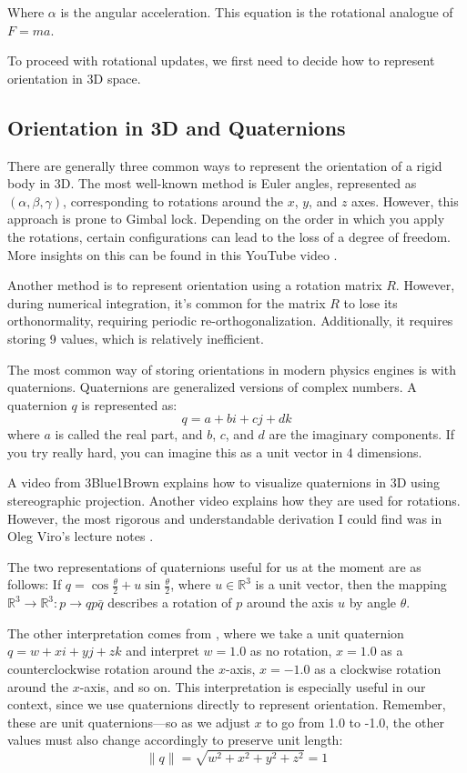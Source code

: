 Where $\alpha$ is the angular acceleration. This equation is the rotational analogue of $F=ma$.

To proceed with rotational updates, we first need to decide how to represent orientation in 3D space.

\subsection{Orientation in 3D and Quaternions}
There are generally three common ways to represent the orientation of a rigid body in 3D. The most well-known method is Euler angles, represented as $(\alpha, \beta, \gamma)$, corresponding to rotations around the $x$, $y$, and $z$ axes. However, this approach is prone to Gimbal lock. Depending on the order in which you apply the rotations, certain configurations can lead to the loss of a degree of freedom. More insights on this can be found in this YouTube video \cite{gimble_video}.

Another method is to represent orientation using a rotation matrix $R$. However, during numerical integration, it's common for the matrix $R$ to lose its orthonormality, requiring periodic re-orthogonalization. Additionally, it requires storing 9 values, which is relatively inefficient.

The most common way of storing orientations in modern physics engines is with quaternions. Quaternions are generalized versions of complex numbers. A quaternion $q$ is represented as:
\[
q = a + bi + cj + dk
\]
where $a$ is called the real part, and $b$, $c$, and $d$ are the imaginary components. If you try really hard, you can imagine this as a unit vector in 4 dimensions.

A video from 3Blue1Brown \cite{3b1b_video} explains how to visualize quaternions in 3D using stereographic projection. Another video \cite{sutrabla_video} explains how they are used for rotations. However, the most rigorous and understandable derivation I could find was in Oleg Viro's lecture notes \cite{viro2016lecture}.

The two representations of quaternions useful for us at the moment are as follows:  
If $q = \cos{\frac{\theta}{2}} + u\sin{\frac{\theta}{2}}$, where $u \in \mathbb{R}^3$ is a unit vector, then the mapping $\mathbb{R}^3 \rightarrow \mathbb{R}^3 : p \rightarrow qp\bar{q}$ describes a rotation of $p$ around the axis $u$ by angle $\theta$.

The other interpretation comes from \cite{sutrabla_video}, where we take a unit quaternion $q = w + xi + yj + zk$ and interpret $w = 1.0$ as no rotation, $x = 1.0$ as a counterclockwise rotation around the $x$-axis, $x = -1.0$ as a clockwise rotation around the $x$-axis, and so on. This interpretation is especially useful in our context, since we use quaternions directly to represent orientation. Remember, these are unit quaternions—so as we adjust $x$ to go from 1.0 to -1.0, the other values must also change accordingly to preserve unit length:
\[
\|q\| = \sqrt{w^2 + x^2 + y^2 + z^2} = 1
\]

